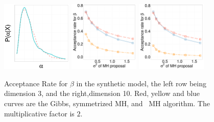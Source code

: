   \begin{figure}[H]
  \centering

  \begin{minipage}[!hp]{0.99\linewidth}
    \includegraphics [width=0.3\textwidth, angle=0]{figs/EXP_ks/exp_hist_44_05_10_.pdf}
    \includegraphics [width=0.30\textwidth, angle=0]{figs/acc/EXP_D3beta_k2.pdf}
	\hspace{.5in}
    \includegraphics [width=0.30\textwidth, angle=0]{figs/acc/EXP_D10beta_k2.pdf}
  \end{minipage}
    \caption{Acceptance Rate for $\beta$ in the synthetic model, the left row being dimension 3, and the right,dimension 10.  Red, yellow and blue curves are the Gibbs, symmetrized MH,
 and \naive\ MH  algorithm. The multiplicative factor is $2$. }
     \label{fig:ACC_EXP}
  \end{figure}
